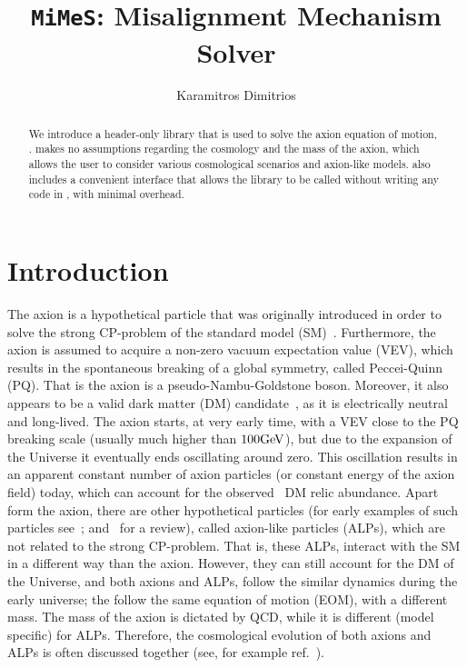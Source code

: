 \documentclass[11pt,a4paper]{article}
\author[ ]{Karamitros Dimitrios}
\affil[ ]{\em School of Physics and Astronomy, The University of Manchester,
	Manchester M13 9PL, United Kingdom}
\affil[ ]{\textit{E-mail: } \href{mailto:dimitrios.karamitros@manchester.ac.uk}{\color{blue}{dimitrios.karamitros@manchester.ac.uk}}}
\title{{\tt MiMeS}: Misalignment Mechanism Solver}
\begin{document}
\maketitle


\begin{abstract}
	We introduce a \CPP header-only library that is used to solve the axion equation of motion, \mimes.  
	\mimes makes no assumptions regarding the cosmology and the mass of the axion, which allows the user 
	to consider various cosmological scenarios and axion-like models.
	\mimes also includes a convenient \PY interface that allows the library to be called without writing any code in \CPP, with minimal overhead.
\end{abstract}


\tableofcontents




\section{Introduction}\label{sec:intro}
\setcounter{equation}{0}
%
The axion is a hypothetical particle that was originally introduced in order to solve the strong CP-problem of the standard model (SM)~\cite{Peccei:1977hh,Weinberg:1977ma,Wilczek:1977pj}. Furthermore, the axion is assumed to acquire a non-zero vacuum expectation value (VEV), which results in the spontaneous breaking of a global symmetry, called Peccei-Quinn (PQ). That is the axion is a pseudo-Nambu-Goldstone boson.  Moreover, it also appears to be a valid dark matter (DM) candidate~\cite{Preskill:1982cy,Dine:1982ah,Abbott:1982af}, as it is electrically neutral and long-lived.  The axion starts, at very early time, with a VEV close to the PQ breaking scale (usually much higher than $100{\rm GeV}$), but due to the expansion of the Universe it eventually ends oscillating around zero. This oscillation results in an apparent constant number of axion particles (or constant energy of the axion field) today, which can account for the observed~\cite{Planck:2018vyg} DM relic abundance. 
%
Apart form the axion, there are other hypothetical particles (for early examples of such particles see~\cite{Chikashige:1980ui,Georgi:1981pu}; and~\cite{Ringwald:2014vqa} for a review), called axion-like particles (ALPs), which are not related to the strong CP-problem. That is, these ALPs, interact with the SM in a different way than the axion. However, they can still account for the DM of the Universe, and both axions and ALPs, follow the similar dynamics during the early universe; the follow the same equation of motion (EOM), with a different mass. The mass of the axion is dictated by QCD, while it is different (model specific) for ALPs.  Therefore, the cosmological evolution of both axions and ALPs is often discussed together (see, for example ref.~\cite{MARSH20161}). 
\end{document}
